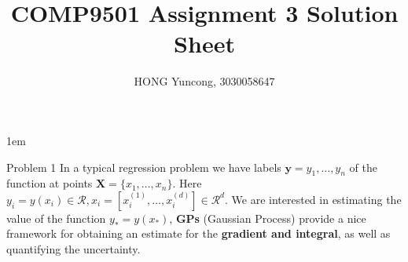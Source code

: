 \documentclass{article}
\newcounter{pcounter}                                   %
\newcommand{\domR}{\mathcal{R}}                         %
\renewcommand{\vec}[1]{\mathbf{#1}}                     %
\begin{document}
    \parindent 0in
    \parskip 1em
    \title{COMP9501 Assignment 3 Solution Sheet}
    \author{HONG Yuncong, 3030058647}
    \maketitle

    \begin{section}{Problem 1}
        \setcounter{pcounter}{0}
        In a typical regression problem we have labels $\vec{y} = y_1, \dots, y_n$ of the function at points $\vec{X} = \{x_1, \dots, x_n\}$. Here $y_i=y(x_i) \in \domR, x_i = [x_i^{(1)}, \dots, x_i^{(d)}] \in \domR^{d}$. We are interested in estimating the value of the function $y_* = y(x_*)$, 
        \textbf{GPs} (Gaussian Process) provide a nice framework for obtaining an estimate for the \textbf{gradient and integral}, as well as quantifying the uncertainty.


\end{section}
\end{document}
